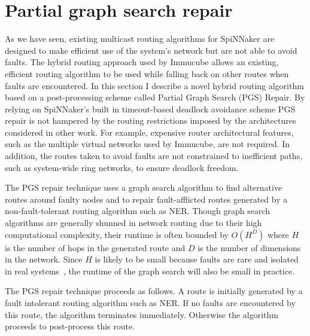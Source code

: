 	\section{Partial graph search repair}
		
		As we have seen, existing multicast routing algorithms for SpiNNaker are
		designed to make efficient use of the system's network but are not able to
		avoid faults. The hybrid routing approach used by Immucube allows an
		existing, efficient routing algorithm to be used while falling back on
		other routes when faults are encountered.  In this section I describe a
		novel hybrid routing algorithm based on a post-processing scheme called
		Partial Graph Search (PGS) Repair.  By relying on SpiNNaker's built in
		timeout-based deadlock avoidance scheme PGS repair is not hampered by the
		routing restrictions imposed by the architectures considered in other work.
		For example, expensive router architectural features, such as the multiple
		virtual networks used by Immucube, are not required. In addition, the
		routes taken to avoid faults are not constrained to inefficient paths, such
		as system-wide ring networks, to ensure deadlock freedom.
		
		The PGS repair technique uses a graph search algorithm to find alternative
		routes around faulty nodes and to repair fault-afflicted routes generated
		by a non-fault-tolerant routing algorithm such as NER. Though graph search
		algorithms are generally shunned in network routing due to their high
		computational complexity, their runtime is often bounded by $O(H^D)$ where
		$H$ is the number of hops in the generated route and $D$ is the number of
		dimensions in the network.  Since $H$ is likely to be small because faults
		are rare and isolated in real systems~\cite{gara05,alverson12}, the runtime
		of the graph search will also be small in practice.
		
		The PGS repair technique proceeds as follows. A route is initially
		generated by a fault intolerant routing algorithm such as NER. If no faults
		are encountered by this route, the algorithm terminates immediately.
		Otherwise the algorithm proceeds to post-process this route.
		
